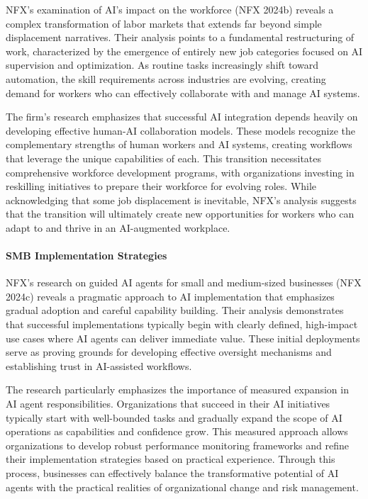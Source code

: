 \documentclass[
]{article}
\begin{document}
NFX's examination of AI's impact on the workforce (NFX 2024b) reveals a
complex transformation of labor markets that extends far beyond simple
displacement narratives. Their analysis points to a fundamental
restructuring of work, characterized by the emergence of entirely new
job categories focused on AI supervision and optimization. As routine
tasks increasingly shift toward automation, the skill requirements
across industries are evolving, creating demand for workers who can
effectively collaborate with and manage AI systems.

The firm's research emphasizes that successful AI integration depends
heavily on developing effective human-AI collaboration models. These
models recognize the complementary strengths of human workers and AI
systems, creating workflows that leverage the unique capabilities of
each. This transition necessitates comprehensive workforce development
programs, with organizations investing in reskilling initiatives to
prepare their workforce for evolving roles. While acknowledging that
some job displacement is inevitable, NFX's analysis suggests that the
transition will ultimately create new opportunities for workers who can
adapt to and thrive in an AI-augmented workplace.

\paragraph{SMB Implementation
Strategies}\label{smb-implementation-strategies}

NFX's research on guided AI agents for small and medium-sized businesses
(NFX 2024c) reveals a pragmatic approach to AI implementation that
emphasizes gradual adoption and careful capability building. Their
analysis demonstrates that successful implementations typically begin
with clearly defined, high-impact use cases where AI agents can deliver
immediate value. These initial deployments serve as proving grounds for
developing effective oversight mechanisms and establishing trust in
AI-assisted workflows.

The research particularly emphasizes the importance of measured
expansion in AI agent responsibilities. Organizations that succeed in
their AI initiatives typically start with well-bounded tasks and
gradually expand the scope of AI operations as capabilities and
confidence grow. This measured approach allows organizations to develop
robust performance monitoring frameworks and refine their implementation
strategies based on practical experience. Through this process,
businesses can effectively balance the transformative potential of AI
agents with the practical realities of organizational change and risk
management.
\end{document}
